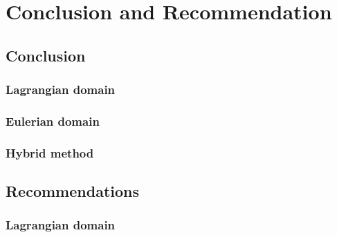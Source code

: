 \chapter{Conclusion and Recommendation}
\label{ch:ConclusionandRecommendation}

\section{Conclusion}

\subsection{Lagrangian domain}

\subsection{Eulerian domain}

\subsection{Hybrid method}



\section{Recommendations}

\subsection{Lagrangian domain}




